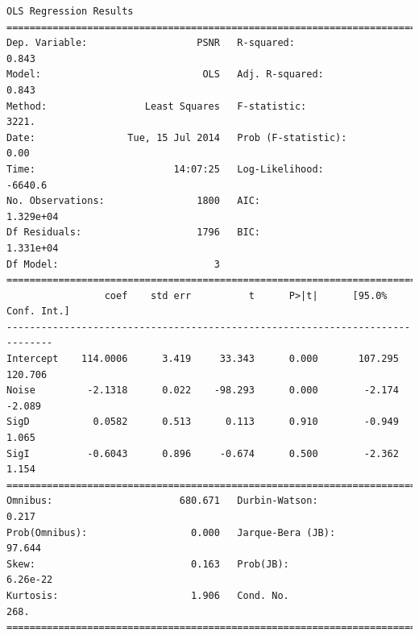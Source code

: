 \documentclass[11pt]{article}
\theoremstyle{definition}
\begin{document}
{\begin{lstlisting}[caption = Time Series 2 - Bilateral Filter Multiple Iterations OLS Model, label = {itrsamebilateral2}]
                            OLS Regression Results                            
==============================================================================
Dep. Variable:                   PSNR   R-squared:                       0.843
Model:                            OLS   Adj. R-squared:                  0.843
Method:                 Least Squares   F-statistic:                     3221.
Date:                Tue, 15 Jul 2014   Prob (F-statistic):               0.00
Time:                        14:07:25   Log-Likelihood:                -6640.6
No. Observations:                1800   AIC:                         1.329e+04
Df Residuals:                    1796   BIC:                         1.331e+04
Df Model:                           3                                         
==============================================================================
                 coef    std err          t      P>|t|      [95.0% Conf. Int.]
------------------------------------------------------------------------------
Intercept    114.0006      3.419     33.343      0.000       107.295   120.706
Noise         -2.1318      0.022    -98.293      0.000        -2.174    -2.089
SigD           0.0582      0.513      0.113      0.910        -0.949     1.065
SigI          -0.6043      0.896     -0.674      0.500        -2.362     1.154
==============================================================================
Omnibus:                      680.671   Durbin-Watson:                   0.217
Prob(Omnibus):                  0.000   Jarque-Bera (JB):               97.644
Skew:                           0.163   Prob(JB):                     6.26e-22
Kurtosis:                       1.906   Cond. No.                         268.
==============================================================================
\end{lstlisting}

}
\end{document}
